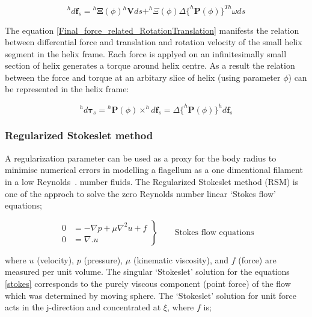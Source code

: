 \documentclass[12pt,a4paper,titlepage]{report}
\begin{document}
\begin{equation}
 ^{h}d\bm{f}_s = {^{h}\bm{\Xi}}(\phi){^{h}\bm{V}}{ds} + ^{h}\Xi(\phi)\Delta{\{^{h}\bm{P}(\phi)}\}^{Th}\omega{ds}
\label{Final_force_related_RotationTranslation}
\end{equation}

The equation \ref{Final_force_related_RotationTranslation} manifests the relation between differential force
and translation and rotation velocity of the small helix segment in the helix frame. Each force is applyed on 
an infinitesimally small section of helix generates a torque around helix centre. As a result the 
relation between the force and torque at an arbitary slice of helix (using parameter $\phi$) can be 
represented in the helix frame:

\begin{equation}
 ^{h}d\bm{\tau}_s = {^{h}\bm{P}(\phi)} \times ^{h}d\bm{f}_s=\Delta{\{^{h}\bm{P}(\phi)}\}^{h}{d\bm{f}_s}
\label{forceTorque_relation_helixFrame}
\end{equation}


 



\subsubsection{Regularized Stokeslet method}\label{method2}

A regularization parameter can be used as a proxy for the body radius to minimise numerical errors
 in modelling a flagellum as a one dimentional filament in a low Reynolds~\citep{smith2009boundary}.
number fluids. The Regularized Stokeslet method (RSM) is one of the approch to solve the zero 
Reynolds number linear \lq{}Stokes flow\rq{} equations;



\begin{equation}
 \left.\begin{aligned}
        0 &= - \nabla p + \mu \nabla ^ 2 u + f \\
        0 &=\nabla . u
       \end{aligned}
 \right\}
 \qquad \text{Stokes flow equations}
\label{stokes}
\end{equation}

where $u$ (velocity), $p$ (pressure), $\mu $ (kinematic viscosity), and $f$ (force) are measured per unit
volume. The singular \lq{}Stokeslet\rq{} solution for the equations \ref{stokes} corresponds to the purely 
viscous component (point force) of the flow which was determined by moving sphere. 
The \lq{}Stokeslet\rq{} solution for unit force acts in the j-direction and concentrated at $\xi $, where $f$ is;
  
\end{document}
